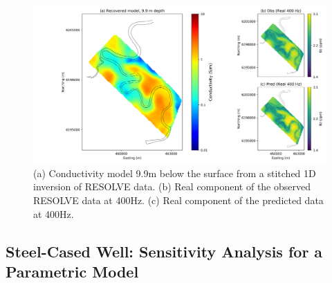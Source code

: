 \documentclass[preprint,review,3p,times,onecolumn,authoryear]{elsarticle}
\begin{document}
{%
\begin{figure}[htb!]
    \centering
    \includegraphics[width=\textwidth]{images/resolve_cond_9m.png}
\caption{
    (a) Conductivity model 9.9m below the surface from a stitched 1D inversion of
    RESOLVE data. (b) Real component of the observed RESOLVE data at 400Hz. (c)
    Real component of the predicted data at 400Hz.
}
\label{fig:bookyInv}
\end{figure}
}



\subsection{Steel-Cased Well: Sensitivity Analysis for a Parametric Model}
\label{sec:steelcasing}
\end{document}
